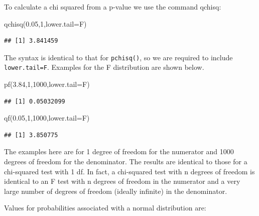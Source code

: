 \documentclass[
]{book}
\newenvironment{Shaded}{\begin{snugshade}}{\end{snugshade}}
\newcommand{\AttributeTok}[1]{\textcolor[rgb]{0.77,0.63,0.00}{#1}}
\newcommand{\DecValTok}[1]{\textcolor[rgb]{0.00,0.00,0.81}{#1}}
\newcommand{\FloatTok}[1]{\textcolor[rgb]{0.00,0.00,0.81}{#1}}
\newcommand{\FunctionTok}[1]{\textcolor[rgb]{0.00,0.00,0.00}{#1}}
\newcommand{\NormalTok}[1]{#1}
\begin{document}
To calculate a chi squared from a p-value we use the command qchisq:

\begin{Shaded}
\begin{Highlighting}[]
\FunctionTok{qchisq}\NormalTok{(}\FloatTok{0.05}\NormalTok{,}\DecValTok{1}\NormalTok{,}\AttributeTok{lower.tail=}\NormalTok{F)}
\end{Highlighting}
\end{Shaded}

\begin{verbatim}
## [1] 3.841459
\end{verbatim}

The syntax is identical to that for \texttt{pchisq()}, so we are required to include \texttt{lower.tail=F}.
Examples for the F distribution are shown below.

\begin{Shaded}
\begin{Highlighting}[]
\FunctionTok{pf}\NormalTok{(}\FloatTok{3.84}\NormalTok{,}\DecValTok{1}\NormalTok{,}\DecValTok{1000}\NormalTok{,}\AttributeTok{lower.tail=}\NormalTok{F)}
\end{Highlighting}
\end{Shaded}

\begin{verbatim}
## [1] 0.05032099
\end{verbatim}

\begin{Shaded}
\begin{Highlighting}[]
\FunctionTok{qf}\NormalTok{(}\FloatTok{0.05}\NormalTok{,}\DecValTok{1}\NormalTok{,}\DecValTok{1000}\NormalTok{,}\AttributeTok{lower.tail=}\NormalTok{F)}
\end{Highlighting}
\end{Shaded}

\begin{verbatim}
## [1] 3.850775
\end{verbatim}

The examples here are for 1 degree of freedom for the numerator and 1000 degrees of freedom for the denominator. The results are identical to those for a chi-squared test with 1 df. In fact, a chi-squared test with n degrees of freedom is identical to an F test with n degrees of freedom in the numerator and a very large number of degrees of freedom (ideally infinite) in the denominator.

Values for probabilities associated with a normal distribution are:
\end{document}
